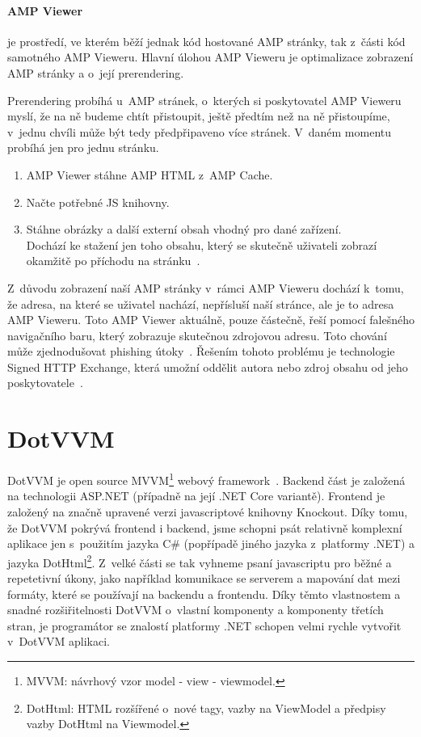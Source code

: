 \subsubsection*{AMP Viewer}
 je prostředí, ve kterém běží jednak kód hostované AMP stránky, tak z~části kód samotného AMP Vieweru. Hlavní úlohou AMP Vieweru je optimalizace zobrazení AMP stránky a o~její prerendering.

Prerendering probíhá u~AMP stránek, o~kterých si poskytovatel AMP Vieweru myslí, že na ně budeme chtít přistoupit, ještě předtím než na ně přistoupíme, v~jednu chvíli může být tedy předpřipaveno více stránek. V~daném momentu probíhá jen pro jednu stránku. 
\begin{gatger}
\begin{enumerate}
    \item AMP Viewer stáhne AMP HTML z~AMP Cache.
    \item Načte potřebné JS knihovny.
    \item Stáhne obrázky a další externí obsah vhodný pro dané zařízení. \\
    Dochází ke stažení jen toho obsahu, který se skutečně uživateli zobrazí okamžitě po příchodu na stránku~\cite{ampConf}.
\end{enumerate}
\end{gatger}
Z~důvodu zobrazení naší AMP stránky v~rámci AMP Vieweru dochází k~tomu, že adresa, na které se uživatel nachází, nepřísluší naší stránce, ale je to adresa AMP Vieweru. Toto AMP Viewer aktuálně, pouze částečně, řeší pomocí falešného navigačního baru, který zobrazuje skutečnou zdrojovou adresu. Toto chování může zjednodušovat phishing útoky~\cite[Ch.\ 3, p.\ 50]{VzhuruDoAMP}.
Řešením tohoto problému je technologie Signed HTTP Exchange, která umožní oddělit autora nebo zdroj obsahu od jeho poskytovatele~\cite[Ch.\ 3, p.\ 51]{VzhuruDoAMP}.
\chapter{DotVVM}
DotVVM je open source MVVM\footnote{MVVM: návrhový vzor model - view - viewmodel.} webový framework~\cite{DotVVMIntro}. Backend část je založená na technologii ASP.NET (případně na její .NET Core variantě). Frontend je založený na značně upravené verzi javascriptové knihovny Knockout. Díky tomu, že DotVVM pokrývá frontend i backend, jsme schopni psát relativně komplexní aplikace jen s~použitím jazyka C\# (popřípadě jiného jazyka z~platformy .NET) a jazyka DotHtml\footnote{DotHtml: HTML rozšířené o~nové tagy, vazby na ViewModel a předpisy vazby DotHtml na Viewmodel.}. Z~velké části se tak vyhneme psaní javascriptu pro běžné a repetetivní úkony, jako například komunikace se serverem a mapování dat mezi formáty, které se používají na backendu a frontendu.
Díky těmto vlastnostem a snadné rozšiřitelnosti DotVVM o~vlastní komponenty a komponenty třetích stran, je programátor se znalostí platformy .NET schopen velmi rychle vytvořit v~DotVVM aplikaci.

